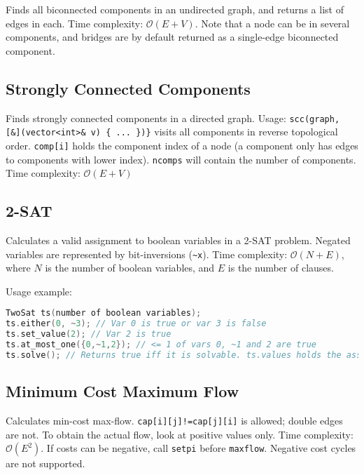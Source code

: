 \documentclass{article}
\begin{document}
Finds all biconnected components in an undirected graph, and returns a list of edges in each. Time complexity: $\mathcal{O}(E + V)$.
Note that a node can be in several components, and bridges are by default returned as a single-edge biconnected component.





\subsection*{Strongly Connected Components}

Finds strongly connected components in a directed graph.
Usage: \lstinline|scc(graph, [&](vector<int>& v) { ... })}| visits all components
in reverse topological order. \texttt{comp[i]} holds the component
index of a node (a component only has edges to components with
lower index). \texttt{ncomps} will contain the number of components.
Time complexity: $\mathcal{O}(E + V)$



\subsection*{2-SAT}

Calculates a valid assignment to boolean variables in a 2-SAT problem.
Negated variables are represented by bit-inversions (\lstinline{~x}).
Time complexity: $\mathcal{O}(N+E)$, where $N$ is the number of boolean variables, and $E$ is the number of clauses.



Usage example:
\begin{lstlisting}[language=cpp]
TwoSat ts(number of boolean variables);
ts.either(0, ~3); // Var 0 is true or var 3 is false
ts.set_value(2); // Var 2 is true
ts.at_most_one({0,~1,2}); // <= 1 of vars 0, ~1 and 2 are true
ts.solve(); // Returns true iff it is solvable. ts.values holds the assigned values to the variables
\end{lstlisting}

\pagebreak

\subsection*{Minimum Cost Maximum Flow}

Calculates min-cost max-flow. \lstinline{cap[i][j]!=cap[j][i]} is allowed; double edges are not. To obtain the actual flow, look at positive values only. Time complexity: $\mathcal{O}(E^2)$.
If costs can be negative, call \lstinline{setpi} before \lstinline{maxflow}. Negative cost cycles are not supported.
\end{document}
